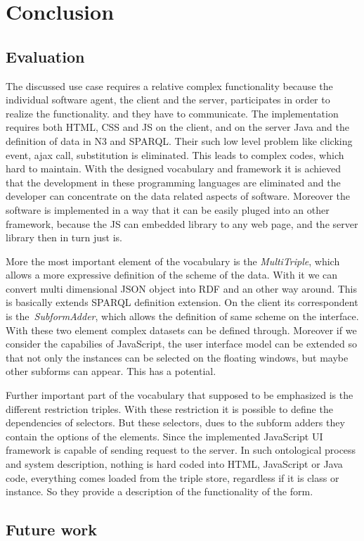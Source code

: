 

\chapter{Conclusion}

\section{Evaluation}


The discussed use case requires a relative complex functionality because the individual software agent, the client and the server, participates in order to realize the functionality. and they have to communicate.  The implementation requires both HTML, CSS and JS on the client, and on the server Java and the definition of data in N3 and SPARQL. Their such low level problem like clicking event, ajax call, substitution is eliminated.
This leads to complex codes, which hard to maintain. With the designed vocabulary and framework it is achieved that the development in these programming languages are eliminated and the developer can concentrate on the data related aspects of software. Moreover the software is implemented in a way that it can be easily pluged into an other framework, because the JS can embedded library to any web page, and the server library then in turn just is.

More the most important element of the vocabulary is the \textit{MultiTriple}, which allows a more expressive definition of the scheme of the data. With it we can convert multi dimensional JSON object into RDF and an other way around. This is basically extends SPARQL definition extension. On the client its correspondent is the \textit{SubformAdder}, which allows the definition of same scheme on the interface. With these two element complex datasets can be defined through. Moreover if we consider the capabilies of JavaScript, the user interface model can be extended so that not only the instances can be selected on the floating windows, but maybe other subforms can appear.
This has a potential.
 
Further important part of the vocabulary that supposed to be emphasized is the different restriction triples. With these restriction it is possible to define the dependencies of selectors. But these selectors, dues to the subform adders they contain the options of the elements. Since the implemented JavaScript UI framework is capable of sending request to the server. In such ontological process and system description, nothing is hard coded into HTML, JavaScript or Java code, everything comes loaded from the triple store, regardless if it is class or instance. So they provide a description of the functionality of the form. 


\section{Future work}

